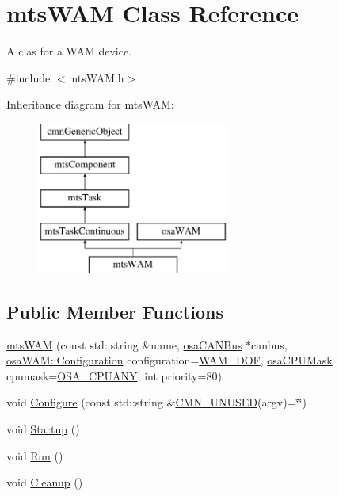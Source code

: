 \hypertarget{classmts_w_a_m}{\section{mts\-W\-A\-M Class Reference}
\label{classmts_w_a_m}
}


A clas for a W\-A\-M device.  




{\ttfamily \#include $<$mts\-W\-A\-M.\-h$>$}

Inheritance diagram for mts\-W\-A\-M\-:\begin{figure}[H]
\begin{center}
\leavevmode
\includegraphics[height=5.000000cm]{d9/d45/classmts_w_a_m}
\end{center}
\end{figure}
\subsection*{Public Member Functions}
\begin{DoxyCompactItemize}
\item 
\hyperlink{classmts_w_a_m_a21fd1872a7f226ad67152896a5cb2909}{mts\-W\-A\-M} (const std\-::string \&name, \hyperlink{classosa_c_a_n_bus}{osa\-C\-A\-N\-Bus} $\ast$canbus, \hyperlink{classosa_w_a_m_ada0b00e10e6401b6b1801cd08f30748b}{osa\-W\-A\-M\-::\-Configuration} configuration=\hyperlink{classosa_w_a_m_ada0b00e10e6401b6b1801cd08f30748ba1bdf2662bd26c893783934b814db4ac3}{W\-A\-M\-\_\-D\-O\-F}, \hyperlink{osa_c_p_u_affinity_8h_aaec7cdd7797e5e6eb5438c15fee5477a}{osa\-C\-P\-U\-Mask} cpumask=\hyperlink{osa_c_p_u_affinity_8h_a2ae5ea257830cff2814d81ce526ada35}{O\-S\-A\-\_\-\-C\-P\-U\-A\-N\-Y}, int priority=80)
\item 
void \hyperlink{classmts_w_a_m_a116d9eaaa932057699aab1fd4a8cd71e}{Configure} (const std\-::string \&\hyperlink{cmn_portability_8h_a021894e2626935fa2305434b1e893ff6}{C\-M\-N\-\_\-\-U\-N\-U\-S\-E\-D}(argv)=\char`\"{}\char`\"{})
\item 
void \hyperlink{classmts_w_a_m_a30637b31116e47f42251b0c802257228}{Startup} ()
\item 
void \hyperlink{classmts_w_a_m_a3e630eeac8155b8c6a61ef3abfb0d14f}{Run} ()
\item 
void \hyperlink{classmts_w_a_m_a6271503261b6ff57b615fd78dd5bcc13}{Cleanup} ()
\end{DoxyCompactItemize}
